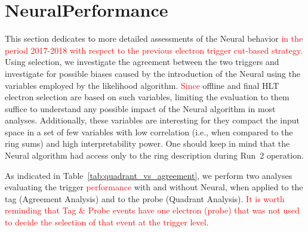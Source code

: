 
\chapter{Neural\rnn Performance}%
\label{sec:off_ana}

This section dedicates to more detailed assessments of the Neural\rnn{} behavior 
\textcolor{red}{in the period 2017-2018 with respect to the previous electron trigger cut-based strategy.}
Using \Zee{} \tnp{}
selection, we investigate the agreement between the two triggers and investigate
for possible biases caused by the introduction of the Neural\rnn{} using the variables
employed by the likelihood algorithm. \textcolor{red}{Since} offline and final HLT electron
selection are based on such variables, limiting the evaluation to them suffice
to understand any possible impact of the Neural\rnn{} algorithm in most analyses.
Additionally, these variables are interesting for they compact the input space
in a set of few variables with low correlation (i.e., when compared to the ring
sums) and high interpretability power. One should keep in mind that the Neural\rnn{}
algorithm had access only to the ring description during Run~2 operation.

As indicated in
Table~\ref{tab:quadrant_vs_agreement}, we perform two analyses evaluating the
trigger \textcolor{red}{performance} with and without Neural\rnn{}, when applied to the tag (Agreement Analysis) and
to the probe (Quadrant Analysis).
\textcolor{red}{ It is worth reminding that Tag \& Probe events have one electron (probe) that was not used to decide the selection of that event at the trigger level.
}

\begin{table}[ht!]\footnotesize
\centering
\caption{Customized \Zee{} \tap{} selection criteria employed in the
agreement and quadrant analyses \textcolor{red}{in the Run 2 (2017-2018 period)}.}%
\label{tab:quadrant_vs_agreement}
\end{table}

